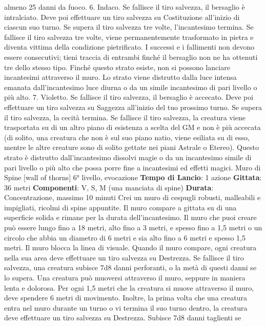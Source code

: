 \begin{multicols}{2}
almeno 25 danni da fuoco.
6. Indaco. Se fallisce il tiro salvezza, il bersaglio è
intralciato. Deve poi effettuare un tiro salvezza su
Costituzione all’inizio di ciascun suo turno. Se supera il
tiro salvezza tre volte, l’incantesimo termina. Se fallisce
il tiro salvezza tre volte, viene permanentemente
trasformato in pietra e diventa vittima della condizione
pietrificato. I successi e i fallimenti non devono essere
consecutivi; tieni traccia di entrambi finché il bersaglio
non ne ha ottenuti tre dello stesso tipo.
Finché questo strato esiste, non si possono lanciare
incantesimi attraverso il muro. Lo strato viene distrutto
dalla luce intensa emanata dall’incantesimo luce diurna
o da un simile incantesimo di pari livello o più alto.
7. Violetto. Se fallisce il tiro salvezza, il bersaglio è
accecato. Deve poi effettuare un tiro salvezza su
Saggezza all’inizio del tuo prossimo turno. Se supera il
tiro salvezza, la cecità termina. Se fallisce il tiro
salvezza, la creatura viene trasportata su di un altro
piano di esistenza a scelta del GM e non è più accecata
(di solito, una creatura che non è sul suo piano natio,
viene esiliata su di esso, mentre le altre creature sono
di solito gettate nei piani Astrale o Etereo). Questo
strato è distrutto dall’incantesimo dissolvi magie o da un
incantesimo simile di pari livello o più alto che possa
porre fine a incantesimi ed effetti magici.
Muro di Spine
[wall of thorns]
6° livello, evocazione
\textbf{Tempo di Lancio}: 1 azione
\textbf{Gittata}: 36 metri
\textbf{Componenti}: V, S, M (una manciata di spine)
\textbf{Durata}: Concentrazione, massimo 10 minuti
Crei un muro di cespugli robusti, malleabili e impigliati,
ricolmi di spine appuntite. Il muro compare a gittata su
di una superficie solida e rimane per la durata
dell’incantesimo. Il muro che puoi creare può essere
lungo fino a 18 metri, alto fino a 3 metri, e spesso fino a
1,5 metri o un circolo che abbia un diametro di 6 metri e
sia alto fino a 6 metri e spesso 1,5 metri. Il muro blocca
la linea di visuale.
Quando il muro compare, ogni creatura nella sua area
deve effettuare un tiro salvezza su Destrezza. Se
fallisce il tiro salvezza, una creatura subisce 7d8 danni
perforanti, o la metà di questi danni se lo supera.
Una creatura può muoversi attraverso il muro, seppure
in maniera lenta e dolorosa. Per ogni 1,5 metri che la
creatura si muove attraverso il muro, deve spendere 6
metri di movimento. Inoltre, la prima volta che una
creatura entra nel muro durante un turno o vi termina il
suo turno dentro, la creatura deve effettuare un tiro
salvezza su Destrezza. Subisce 7d8 danni taglienti se

\end{multicols}
